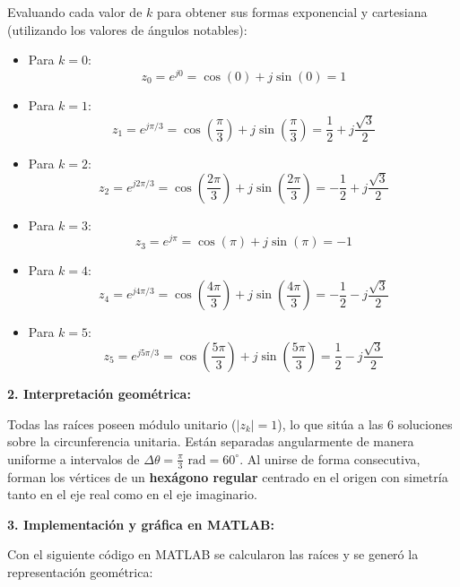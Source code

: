\documentclass[11pt,a4paper]{article}
\begin{document}
Evaluando cada valor de $k$ para obtener sus formas exponencial y cartesiana (utilizando los valores de ángulos notables):
\begin{itemize}
    \item Para $k = 0$:
    \[
    z_0 = e^{j0} = \cos(0) + j\sin(0) = 1
    \]
    
    \item Para $k = 1$:
    \[
    z_1 = e^{j\pi/3} = \cos\left(\frac{\pi}{3}\right) + j\sin\left(\frac{\pi}{3}\right) = \frac{1}{2} + j\frac{\sqrt{3}}{2}
    \]
    
    \item Para $k = 2$:
    \[
    z_2 = e^{j2\pi/3} = \cos\left(\frac{2\pi}{3}\right) + j\sin\left(\frac{2\pi}{3}\right) = -\frac{1}{2} + j\frac{\sqrt{3}}{2}
    \]
    
    \item Para $k = 3$:
    \[
    z_3 = e^{j\pi} = \cos(\pi) + j\sin(\pi) = -1
    \]
    
    \item Para $k = 4$:
    \[
    z_4 = e^{j4\pi/3} = \cos\left(\frac{4\pi}{3}\right) + j\sin\left(\frac{4\pi}{3}\right) = -\frac{1}{2} - j\frac{\sqrt{3}}{2}
    \]
    
    \item Para $k = 5$:
    \[
    z_5 = e^{j5\pi/3} = \cos\left(\frac{5\pi}{3}\right) + j\sin\left(\frac{5\pi}{3}\right) = \frac{1}{2} - j\frac{\sqrt{3}}{2}
    \]
\end{itemize}

\noindent\textbf{2. Interpretación geométrica:}

Todas las raíces poseen módulo unitario ($|z_k| = 1$), lo que sitúa a las 6 soluciones sobre la circunferencia unitaria. Están separadas angularmente de manera uniforme a intervalos de $\Delta\theta = \frac{\pi}{3}\text{ rad} = 60^\circ$. Al unirse de forma consecutiva, forman los vértices de un \textbf{hexágono regular} centrado en el origen con simetría tanto en el eje real como en el eje imaginario.

\noindent\textbf{3. Implementación y gráfica en MATLAB:}

Con el siguiente código en MATLAB se calcularon las raíces y se generó la representación geométrica:
\end{document}
